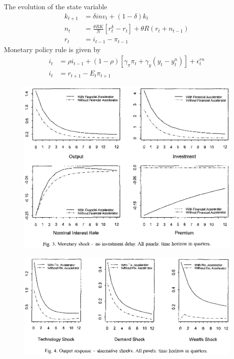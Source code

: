 \documentclass{beamer}
\begin{document}
\begin{frame}
  The evolution of the state variable 
\begin{align}
  k_{t+1} &= \delta inv_t + (1-\delta)k_t\\
  n_t &= \frac{\theta RK}{N}[r_ t^k - r_t] + \theta R(r_t+n_{t-1})\\
  r_t &= i_{t-1} - \pi_{t-1}
\end{align}
\medskip
Monetary policy rule is given by
\begin{align}
  i_t &= \rho i_{t-1} + (1-\rho)[\gamma_{\pi}\pi_t + \gamma_y(y_t - y_t^n)]+ \epsilon_t^{rn}\\
  i_t &= r_{t+1} - E_t\pi_{t+1}
\end{align}
\end{frame}

\begin{frame}
 \begin{figure}
   \includegraphics[scale=.8]{bernanke.eps}
 \end{figure}  
\end{frame}

\begin{frame}
 \begin{figure}
   \includegraphics[scale=.8]{bernanke2.eps}
 \end{figure}  
\end{frame}
\end{document}
